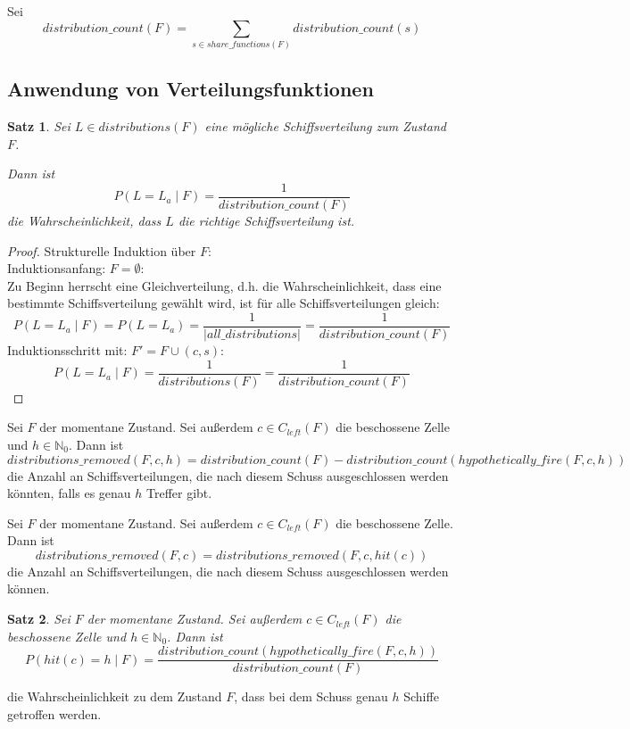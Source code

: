 \documentclass[a4paper,12pt]{llncs}
\newcommand{\N}{{\mathbb{N}}}
\numberwithin{equation}{section}
\newtheorem{satz}{Satz}
\begin{document}
\begin{definition}
Sei
\[
distribution\_count(F)=\sum_{s \in share\_functions(F)}{distribution\_count(s)}
\]
\end{definition}

\subsection{Anwendung von Verteilungsfunktionen}

\begin{satz}
Sei $L \in distributions(F)$ eine mögliche Schiffsverteilung zum Zustand $F$.

Dann ist
\[
P(L = L_a \mid F)=\frac{1}{distribution\_count(F)}
\]
die Wahrscheinlichkeit, dass $L$ die richtige Schiffsverteilung ist.
\end{satz}

\begin{proof}
Strukturelle Induktion über $F$:\\
Induktionsanfang: $F=\emptyset$:\\
Zu Beginn herrscht eine Gleichverteilung, d.h. die Wahrscheinlichkeit, dass eine bestimmte Schiffsverteilung gewählt wird, ist für alle Schiffsverteilungen gleich:
\[
P(L = L_a \mid F)=P(L = L_a)=\frac{1}{|all\_distributions|}=\frac{1}{distribution\_count(F)}
\]
Induktionsschritt mit: $F'=F \cup (c,s)$:\\
\[
P(L = L_a \mid F)=\frac{1}{distributions(F)}=\frac{1}{distribution\_count(F)}
\]
\end{proof}

\begin{definition}
Sei $F$ der momentane Zustand.
Sei außerdem $c \in C_{left}(F)$ die beschossene Zelle und $h \in \N_0$.
Dann ist
\[
distributions\_removed(F,c,h)=distribution\_count(F) - distribution\_count(hypothetically\_fire(F,c, h))
\]
die Anzahl an Schiffsverteilungen, die nach diesem Schuss ausgeschlossen werden könnten, falls es genau $h$ Treffer gibt.
\end{definition}

\begin{definition}
Sei $F$ der momentane Zustand.
Sei außerdem $c \in C_{left}(F)$ die beschossene Zelle.
Dann ist
\[
distributions\_removed(F,c)=distributions\_removed(F, c, hit(c))
\]
die Anzahl an Schiffsverteilungen, die nach diesem Schuss ausgeschlossen werden können.
\end{definition}

\begin{satz}
Sei $F$ der momentane Zustand.
Sei außerdem $c \in C_{left}(F)$ die beschossene Zelle und $h \in \N_0$.
Dann ist
\[
P(hit(c)=h \mid F)=\frac{distribution\_count(hypothetically\_fire(F,c, h))}{distribution\_count(F)}
\]
\end{satz}
die Wahrscheinlichkeit zu dem Zustand $F$, dass bei dem Schuss genau $h$ Schiffe getroffen werden.
\end{document}
